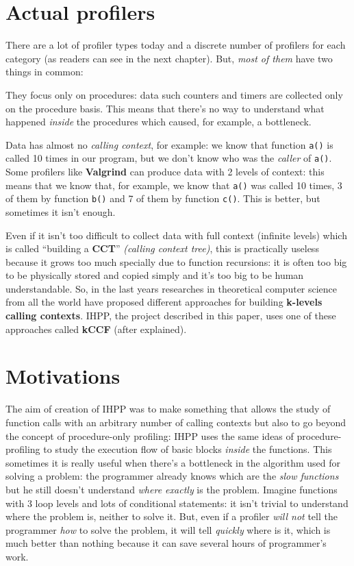 \documentclass[a4paper,11pt]{report}
\begin{document}
\section{Actual profilers}

There are a lot of profiler types today and a discrete number of profilers for each category (as readers can see in the next chapter). But, \emph{most of them} have two things in common:

\begin{itemize*}
\item They focus only on procedures: data such counters and timers are collected only on the procedure basis. This means that there's no way to understand what happened \emph{inside} the procedures which caused, for example, a bottleneck.
\item Data has almost no \emph{calling context}, for example: we know that function \verb|a()| is called 10 times in our program, but we don't know who was the \emph{caller} of \verb|a()|. Some profilers like \textbf{Valgrind} can produce data with 2 levels of context: this means that we know that, for example, we know that \verb|a()| was called 10 times, 3 of them by function \verb|b()| and 7 of them by function \verb|c()|. This is better, but sometimes it isn't enough.
\end{itemize*}

Even if it isn't too difficult to collect data with full context (infinite levels) which is called ``building a \textbf{CCT}'' \emph{(calling context tree)}, this is practically useless because it grows too much specially due to function recursions: it is often too big to be physically stored and copied simply and it's too big to be human understandable. 
So, in the last years researches in theoretical computer science from all the world have proposed different approaches for building \textbf{k-levels calling contexts}. IHPP, the project described in this paper, uses one of these approaches called \textbf{kCCF} (after explained).

\section{Motivations}

The aim of creation of IHPP was to make something that allows the study of function calls with an arbitrary number of calling contexts but also to go beyond the concept of procedure-only profiling: IHPP uses the same ideas of procedure-profiling to study the execution flow of basic blocks \emph{inside} the functions. This sometimes it is really useful when there's a bottleneck in the algorithm used for solving a problem: the programmer already knows which are the \emph{slow functions} but he still doesn't understand \emph{where exactly} is the problem. Imagine functions with 3 loop levels and lots of conditional statements: it isn't trivial to understand where the problem is, neither to solve it. But, even if a profiler \emph{will not} tell the programmer \emph{how} to solve the problem, it will tell \emph{quickly} where is it, which is much better than nothing because it can save several hours of programmer's work. 
\end{document}
